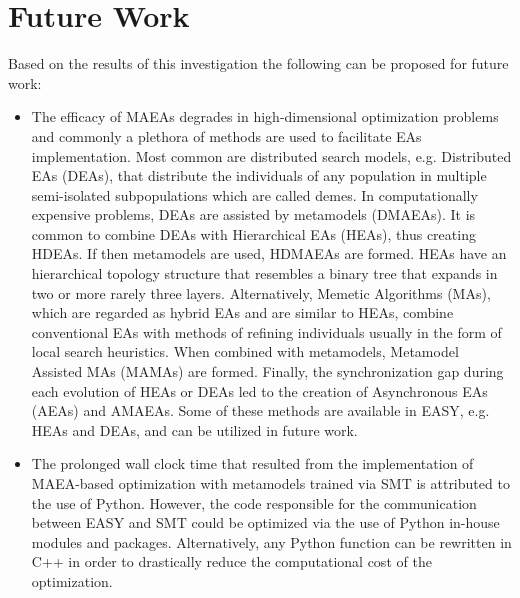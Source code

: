 \newpage


\section{Future Work}
Based on the results of this investigation the following can be 
proposed for future work:

\begin{itemize}

\item The efficacy of MAEAs degrades in high-dimensional 
optimization problems and commonly a plethora of methods are used 
to facilitate EAs implementation. Most common are distributed 
search models, e.g. Distributed EAs (DEAs)\cite{DEA,DEA1}, that 
distribute the individuals of any population in multiple 
semi-isolated subpopulations which are called demes. In 
computationally expensive problems, DEAs are assisted by metamodels 
(DMAEAs)\cite{DMAEA}. It is common to combine DEAs 
with Hierarchical EAs (HEAs)\cite{DEA1,HEA}, thus creating 
HDEAs\cite{HDEA}. If then metamodels are used, HDMAEAs\cite{HDMAEA} 
are formed. HEAs have an hierarchical topology structure that
resembles a binary tree that expands in two or more rarely 
three layers. Alternatively, Memetic Algorithms (MAs)\cite{MA}, 
which are regarded as hybrid EAs and are similar to HEAs, combine 
conventional EAs with methods of refining individuals usually in 
the form of local search heuristics. When combined with metamodels,
Metamodel Assisted MAs (MAMAs)\cite{MAMA,MAMA1} are formed. 
Finally, the synchronization gap during each evolution of HEAs or 
DEAs led to the creation of Asynchronous EAs (AEAs)\cite{AEA,AEA1} 
and AMAEAs\cite{AMAEA}. Some of these methods are available in 
EASY, e.g. HEAs and DEAs, and can be utilized in future work. \\


\item The prolonged wall clock time that resulted from the 
implementation of MAEA-based optimization with metamodels trained 
via SMT is attributed to the use of Python. However, the code 
responsible for the communication between EASY and SMT could be 
optimized via the use of Python in-house modules and packages. 
Alternatively, any Python function can be rewritten in C++ in order 
to drastically reduce the computational cost of the optimization.


\end{itemize}
